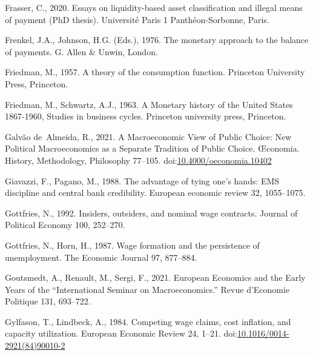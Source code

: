 \documentclass[]{elsarticle} %
\newlength{\cslhangindent}
\newlength{\cslentryspacingunit} %
\newenvironment{CSLReferences}[2] %
 {%
  \setlength{\parindent}{0pt}
  \ifodd #1
  \let\oldpar\par
  \def\par{\hangindent=\cslhangindent\oldpar}
  \fi
  \setlength{\parskip}{#2\cslentryspacingunit}
 }%
 {}
\begin{document}
\begin{CSLReferences}{1}{0}
\leavevmode{}%
Frasser, C., 2020. Essays on liquidity-based asset classiﬁcation and
illegal means of payment (PhD thesis). Université Paris 1
Panthéon-Sorbonne, Paris.

\leavevmode{}%
Frenkel, J.A., Johnson, H.G. (Eds.), 1976. The monetary approach to the
balance of payments. {G. Allen \& Unwin}, {London}.

\leavevmode{}%
Friedman, M., 1957. A theory of the consumption function. Princeton
University Press, Princeton.

\leavevmode{}%
Friedman, M., Schwartz, A.J., 1963. A {Monetary} history of the {United}
{States} 1867-1960, Studies in business cycles. Princeton university
press, Princeton.

\leavevmode{}%
Galvão de~Almeida, R., 2021. A {Macroeconomic View} of {Public Choice}:
{New Political Macroeconomics} as a {Separate Tradition} of {Public
Choice}. Œconomia. History, Methodology, Philosophy 77--105.
doi:\href{https://doi.org/10.4000/oeconomia.10402}{10.4000/oeconomia.10402}

\leavevmode{}%
Giavazzi, F., Pagano, M., 1988. The advantage of tying one's hands:
{EMS} discipline and central bank credibility. European economic review
32, 1055--1075.

\leavevmode{}%
Gottfries, N., 1992. Insiders, outsiders, and nominal wage contracts.
Journal of Political Economy 100, 252--270.

\leavevmode{}%
Gottfries, N., Horn, H., 1987. Wage formation and the persistence of
unemployment. The Economic Journal 97, 877--884.

\leavevmode{}%
Goutsmedt, A., Renault, M., Sergi, F., 2021. European {Economics} and
the {Early Years} of the {``{International Seminar} on
{Macroeconomics}.''} Revue d'Economie Politique 131, 693--722.

\leavevmode{}%
Gylfason, T., Lindbeck, A., 1984. Competing wage claims, cost inflation,
and capacity utilization. European Economic Review 24, 1--21.
doi:\href{https://doi.org/10.1016/0014-2921(84)90010-2}{10.1016/0014-2921(84)90010-2}


\end{CSLReferences}
\end{document}
